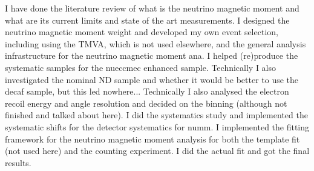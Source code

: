 I have done the literature review of what is the neutrino magnetic moment and what are its current limits and state of the art measurements. I designed the neutrino magnetic moment weight and developed my own event selection, including using the TMVA, which is not used elsewhere, and the general analysis infrastructure for the neutrino magnetic moment ana. I helped (re)produce the systematic samples for the nueccmec enhanced sample. Technically I also investigated the nominal ND sample and whether it would be better to use the decaf sample, but this led nowhere... Technically I also analysed the electron recoil energy and angle resolution and decided on the binning (although not finished and talked about here). I did the systematics study and implemented the systematic shifts for the detector systematics for numm. I implemented the fitting framework for the neutrino magnetic moment analysis for both the template fit (not used here) and the counting experiment. I did the actual fit and got the final results.
\fi